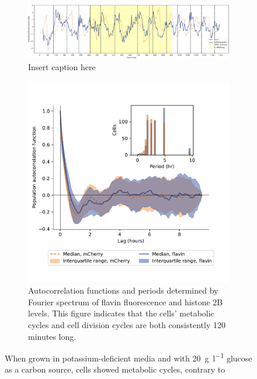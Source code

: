 \begin{figure}
  \centering
  \begin{subfigure}[htpb]{0.9\textwidth}
   \centering
   \includegraphics[width=\textwidth]{htb2mCherry_613_plots_single_htb2mCherry012_90_2_adapted.pdf}
   \caption{
     Insert caption here
   }
   \label{fig:biology-kdeficient-single}
  \end{subfigure}

  \begin{subfigure}[htpb]{0.7\textwidth}
   \centering
   \includegraphics[width=\textwidth]{htb2mCherry_613_12.pdf}
   \caption{
     Autocorrelation functions and periods determined by Fourier spectrum of flavin fluorescence and histone 2B levels.
     This figure indicates that the cells' metabolic cycles and cell division cycles are both consistently 120 minutes long.
   }
   \label{fig:biology-kdeficient-acf}
  \end{subfigure}

  \caption{
    When grown in potassium-deficient media and with \SI{20}{\gram~\litre^{-1}} glucose as a carbon source, cells showed metabolic cycles, contrary to \textcite{oneillEukaryoticCellBiology2020}
  }
  \label{fig:biology-kdeficient}
\end{figure}


